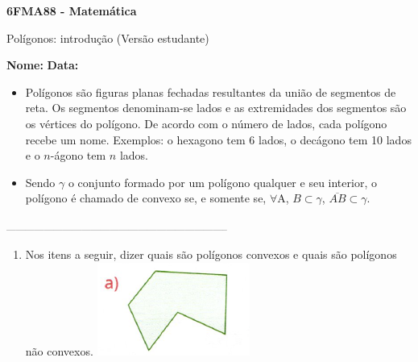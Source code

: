 \documentclass[a4paper,14pt]{article}
\begin{document}
	
	\noindent\textbf{6FMA88 - Matemática} 
	
	\begin{center}Polígonos: introdução (Versão estudante)
	\end{center}
	
	\noindent\textbf{Nome:} \underline{\hspace{10cm}}
	\noindent\textbf{Data:} \underline{\hspace{4cm}}
	
	
	\begin{multicols}{2}
		\noindent \begin{itemize}
			\item Polígonos são figuras planas fechadas resultantes da união de segmentos de reta. Os segmentos denominam-se lados e as extremidades dos segmentos são os vértices do polígono. De acordo com o número de lados, cada polígono recebe um nome. Exemplos: o hexagono tem 6 lados, o decágono tem 10 lados e o $n$-ágono tem $n$ lados.
			\item Sendo $\gamma$ o conjunto formado por um polígono qualquer e seu interior, o polígono é chamado de convexo se, e somente se, $\forall$A, $B \subset \gamma$, $\overline{AB} \subset \gamma$.
		\end{itemize}
		\noindent\textsubscript{-----------------------------------------------------------------------}
		\begin{enumerate} 
			\item Nos itens a seguir, dizer quais são polígonos convexos e quais são polígonos não convexos.
			\includegraphics[width=1\linewidth]{6FMA88_imagens/imagem1}

\end{enumerate}
\end{multicols}
\end{document}
